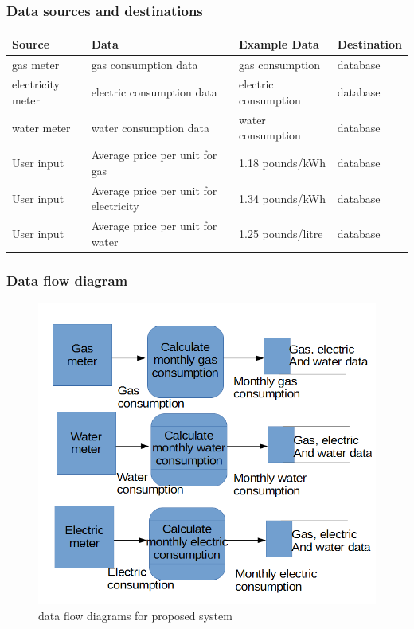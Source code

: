 \subsubsection{Data sources and destinations}
\begin{center}
\begin{tabular}{|l|l|l|l|}
	\hline
	\textbf{Source} & \textbf{Data} & \textbf{Example Data} & \textbf{Destination} \\ \hline
	gas meter & gas consumption data & gas consumption & database \\ \hline
 	electricity meter & electric consumption data & electric consumption & database \\ \hline
	water meter & water consumption data & water consumption & database \\ \hline
	User input & Average price per unit for gas & 1.18 pounds/kWh & database \\ \hline
 	User input & Average price per unit for electricity & 1.34 pounds/kWh & database \\ \hline
	User input & Average price per unit for water & 1.25 pounds/litre & database \\ \hline
\end{tabular}
\label{tab:Data sources and destinations for the proposed system}
\end{center}

\subsubsection{Data flow diagram}
\begin{figure}[H]
    \includegraphics[width=\textwidth]{./dataflowdiagrams3.png}
    \caption{data flow diagrams for proposed system} \label{fig:dataflowdiagrams}
\end{figure}

